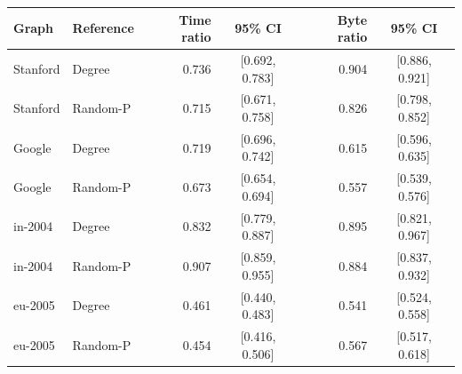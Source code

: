 \begin{tabular}{@{}llrcrc@{}}
\toprule
Graph & Reference & Time ratio & 95\% CI & Byte ratio & 95\% CI \\
\midrule
Stanford & Degree & 0.736 & [0.692, 0.783] & 0.904 & [0.886, 0.921] \\
Stanford & Random-P & 0.715 & [0.671, 0.758] & 0.826 & [0.798, 0.852] \\
Google & Degree & 0.719 & [0.696, 0.742] & 0.615 & [0.596, 0.635] \\
Google & Random-P & 0.673 & [0.654, 0.694] & 0.557 & [0.539, 0.576] \\
in-2004 & Degree & 0.832 & [0.779, 0.887] & 0.895 & [0.821, 0.967] \\
in-2004 & Random-P & 0.907 & [0.859, 0.955] & 0.884 & [0.837, 0.932] \\
eu-2005 & Degree & 0.461 & [0.440, 0.483] & 0.541 & [0.524, 0.558] \\
eu-2005 & Random-P & 0.454 & [0.416, 0.506] & 0.567 & [0.517, 0.618] \\
\bottomrule
\end{tabular}
